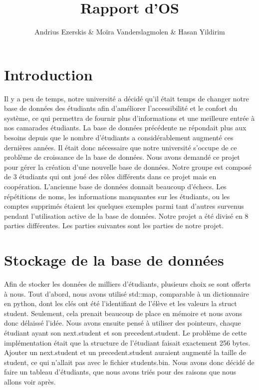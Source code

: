 \documentclass[utf8]{article}
\begin{document}
\begin{titlepage}
    

\author{Andrius Ezerskis \& Moïra Vanderslagmolen \& Hasan Yildirim}
\title{Rapport d'OS}

\maketitle
\end{titlepage}

\section{Introduction}
\par
Il y a peu de temps, notre université a décidé qu'il était temps de changer notre base de données des étudiants afin d'améliorer l'accessibilité et le confort du système, ce qui permettra de fournir plus d'informations et une meilleure entrée à nos camarades étudiants. La base de données précédente ne répondait plus aux besoins depuis que le nombre d'étudiants a considérablement augmenté ces dernières années. Il était donc nécessaire que notre université s'occupe de ce problème de croissance de la base de données.
Nous avons demandé ce projet pour gérer la création d'une nouvelle base de données. Notre groupe est composé de 3 étudiants qui ont joué des rôles différents dans ce projet mais en coopération. L'ancienne base de données donnait beaucoup d'échecs. Les répétitions de noms, les informations manquantes sur les étudiants, ou les comptes supprimés étaient les quelques exemples parmi tant d'autres survenus pendant l'utilisation active de la base de données. Notre projet a été divisé en 8 parties différentes. Les parties suivantes sont les parties de notre projet.
\par


\section{Stockage de la base de données}
\indent{}
\par
Afin de stocker les données de milliers d'étudiants, plusieurs choix se sont offerts à nous. 
Tout d'abord, nous avons utilisé std::map, comparable à un dictionnaire en python, dont les
clés ont été l'identifiant de l'élève et les valeurs la struct student. Seulement, cela
prenait beaucoup de place en mémoire et nous avons donc délaissé l'idée. Nous avons ensuite pensé à utiliser des pointeurs, chaque étudiant
ayant son next.student et son precedent.student. Le problème de cette implémentation était que la structure de l'étudiant faisait exactement 256 bytes.
Ajouter un next.student et un precedent.student auraient augmenté la taille de student, ce qui n'allait pas avec le fichier students.bin.
Nous avons donc décidé de faire un tableau d'étudiants, que nous avons triés pour des raisons que nous allons voir après.
\par
\end{document}
